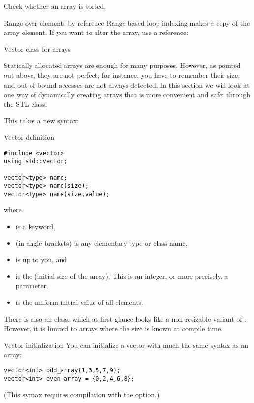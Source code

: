 \begin{exercise}
  \label{ex:array-sorted}
  Check whether an array is sorted.
\end{exercise}

\begin{block}{Range over elements by reference}
  \label{sl:array-range-ref}
  Range-based loop indexing makes a copy of the array element. If you
  want to alter the array, use a reference:
\end{block}

 {Vector class for arrays}
\label{sec:stdvector}

Statically allocated arrays are enough for many purposes. However, as
pointed out above, they are not perfect; for instance, you have to
remember their size, and out-of-bound accesses are not always
detected. In this section we
will look at one way of dynamically creating arrays
that is more convenient and safe: through the STL
 class.

This takes a new syntax:

\begin{block}{Vector definition}
  \label{sl:vector-def}
\begin{verbatim}
#include <vector>
using std::vector;

vector<type> name;
vector<type> name(size);
vector<type> name(size,value);
\end{verbatim}
where
\begin{itemize}
\item {} is a keyword,
\item {} (in angle brackets) is any elementary type or class
  name,
\item {} is up to you, and
\item {} is the (initial size of the array). This is an integer,
  or more precisely, a  parameter.
\item {} is the uniform initial value of all elements.
\end{itemize}
\end{block}

\begin{remark}
  There is also an  class, which at first glance
  looks like a non-resizable variant of . However, it is limited to
  arrays where the size is known at compile time.
\end{remark}

\begin{block}{Vector initialization}
  \label{sl:vector-init}
  You can initialize a vector with much the same syntax as an array:
\begin{verbatim}
vector<int> odd_array{1,3,5,7,9};
vector<int> even_array = {0,2,4,6,8};
\end{verbatim}
(This syntax requires compilation with the 
option.)
\end{block}

